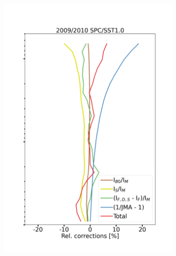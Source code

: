 \documentclass{article}
\begin{document}
\begin{figure}
\begin{subfigure}[t]{0.33\textwidth}
            \includegraphics[width=\linewidth]{png/relative_corrections_unc__sm_hv_0910_TRRM_SPC1010}
        \end{subfigure}%
    \hspace{-0.54cm}
        \begin{subfigure}[t]{0.33\textwidth}

\end{subfigure}
\end{figure}
\end{document}
